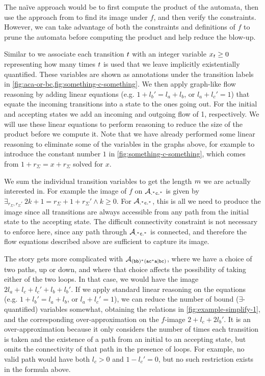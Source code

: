\documentclass[acmsmall,review,anonymous,screen]{acmart}\settopmatter{printfolios=true,printccs=false,printacmref=true}
\theoremstyle{definition}
\begin{document}
The na\"ive approach would be to first compute the product of the automata, then
use the approach from \cite{generate-parikh-image} to find its image under $f$,
and then verify the constraints. However, we can take advantage of both the
constraints and definitions of $f$ to prune the automata before computing the
product and help reduce the blow-up.

Similar to \cite{generate-parikh-image} we associate each transition
$t$ with an integer variable $x_t \geq 0$
representing how many times $t$ is used that we leave implicitly
existentially quantified. These variables are shown as annotations under the
transition labels in \cref{fig:aca-or-bc,fig:something-c-something}. We then
apply graph-like flow reasoning by adding linear equations (e.g. $1 + {l_b}' =
l_a + l_b$, or $l_a + l_c' = 1$) that equate the incoming transitions into a
state to the ones going out. For the initial and accepting states we add an
incoming and outgoing flow of 1, respectively. We will use these linear
equations to perform reasoning to reduce the size of the product before we
compute it. Note that we have already performed some linear reasoning to
eliminate some of the variables in the graphs above, for example to introduce
the constant number $1$ in \cref{fig:something-c-something}, which comes from $1
+ r_\Sigma = x + r_\Sigma$ solved for $x$.

We sum the individual transition variables to get the length $m$ we
are actually interested in. For example the image of $f$ on
$\mathcal{A}_{\mathtt{.^\ast{}c.^\ast}}$ is given by $\exists_{r_\Sigma, r_\Sigma'} \: 2k + 1 =
r_\Sigma + 1 + r_\Sigma' \land k \geq 0$. For $\mathcal{A}_{\mathtt{.^\ast{}c.^\ast}}{}$, this is
all we need to produce the image since all transitions are always accessible
from any path from the initial state to the accepting state. The difficult
connectivity constraint is not necessary to enforce here, since any path through
$\mathcal{A}_{\mathtt{.^\ast{}c.^\ast}}{}$ is connected, and therefore the flow equations
described above are sufficient to capture its image.

The story gets more complicated with $\mathcal{A}_{\mathtt{(bb)^\ast(ac^\ast{}a|bc)}}{}$, where we have a choice of two
paths, up or down, and where that choice affects the possibility of taking
either of the two loops. In that case, we would have the image $2l_a + l_c + l_c' + l_b + l_b'$.
If we apply standard linear reasoning on the equations (e.g. $1 + {l_b}' = l_a +
l_b$, or $l_a + l_c' = 1$), we can reduce the number of bound
($\exists$-quantified) variables somewhat, obtaining the relations in
\cref{fig:example-simplify-1}, and the corresponding over-approximation on
the $f$-image $2 + l_c + 2l_b'$. It is an over-approximation because it only
considers the number of times each transition is taken and the existence of a
path from an initial to an accepting state, but omits the connectivity of that
path in the presence of loops. For example, no valid path would have both $l_c >
0$ and $1 - l_c' = 0$, but no such restriction exists in the formula above.
\end{document}

